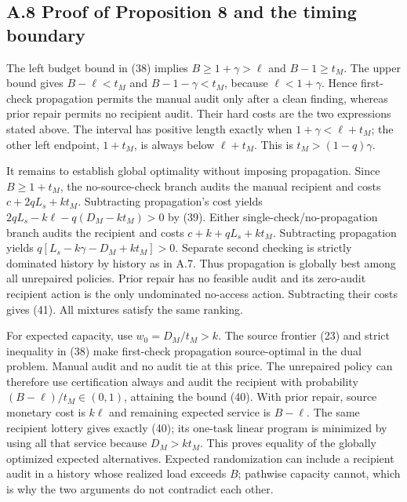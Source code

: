 \documentclass[
  11pt,
  a4paper,
]{article}
\begin{document}
\hypertarget{a.8-proof-of-proposition-8-and-the-timing-boundary}{%
\subsection{A.8 Proof of Proposition 8 and the timing
boundary}\label{a.8-proof-of-proposition-8-and-the-timing-boundary}}

The left budget bound in (38) implies \(B\geq1+\gamma>\ell\) and
\(B-1\geq t_M\). The upper bound gives \(B-\ell<t_M\) and
\(B-1-\gamma<t_M\), because \(\ell<1+\gamma\). Hence first-check
propagation permits the manual audit only after a clean finding, whereas
prior repair permits no recipient audit. Their hard costs are the two
expressions stated above. The interval has positive length exactly when
\(1+\gamma<\ell+t_M\); the other left endpoint, \(1+t_M\), is always
below \(\ell+t_M\). This is \(t_M>(1-q)\gamma\).

It remains to establish global optimality without imposing propagation.
Since \(B\geq1+t_M\), the no-source-check branch audits the manual
recipient and costs \(c+2qL_s+kt_M\). Subtracting propagation's cost
yields \(2qL_s-k\ell-q(D_M-kt_M)>0\) by (39). Either
single-check/no-propagation branch audits the recipient and costs
\(c+k+qL_s+kt_M\). Subtracting propagation yields
\(q[L_s-k\gamma-D_M+kt_M]>0\). Separate second checking is strictly
dominated history by history as in A.7. Thus propagation is globally
best among all unrepaired policies. Prior repair has no feasible audit
and its zero-audit recipient action is the only undominated no-access
action. Subtracting their costs gives (41). All mixtures satisfy the
same ranking.

For expected capacity, use \(w_0=D_M/t_M>k\). The source frontier (23)
and strict inequality in (38) make first-check propagation
source-optimal in the dual problem. Manual audit and no audit tie at
this price. The unrepaired policy can therefore use certification always
and audit the recipient with probability \((B-\ell)/t_M\in(0,1)\),
attaining the bound (40). With prior repair, source monetary cost is
\(k\ell\) and remaining expected service is \(B-\ell\). The same
recipient lottery gives exactly (40); its one-task linear program is
minimized by using all that service because \(D_M>kt_M\). This proves
equality of the globally optimized expected alternatives. Expected
randomization can include a recipient audit in a history whose realized
load exceeds \(B\); pathwise capacity cannot, which is why the two
arguments do not contradict each other.
\end{document}
